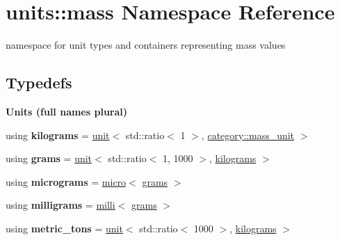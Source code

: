 \hypertarget{namespaceunits_1_1mass}{}\section{units\+:\+:mass Namespace Reference}
\label{namespaceunits_1_1mass}


namespace for unit types and containers representing mass values  


\subsection*{Typedefs}
\begin{Indent}{\bf Units (full names plural)}\par
\begin{DoxyCompactItemize}
\item 
\hypertarget{namespaceunits_1_1mass_aada0f884028ef6dd8fff91f7a450adba}{}using {\bfseries kilograms} = \hyperlink{structunits_1_1unit}{unit}$<$ std\+::ratio$<$ 1 $>$, \hyperlink{namespaceunits_1_1category_a2a957f5535dc0cbe3d3fb3f31e5f0d21}{category\+::mass\+\_\+unit} $>$\label{namespaceunits_1_1mass_aada0f884028ef6dd8fff91f7a450adba}

\item 
\hypertarget{namespaceunits_1_1mass_a9e2e3361968bd7509f6620ee37b5f589}{}using {\bfseries grams} = \hyperlink{structunits_1_1unit}{unit}$<$ std\+::ratio$<$ 1, 1000 $>$, \hyperlink{structunits_1_1unit}{kilograms} $>$\label{namespaceunits_1_1mass_a9e2e3361968bd7509f6620ee37b5f589}

\item 
\hypertarget{namespaceunits_1_1mass_ac013c660b7d96662397d3f3187cf8330}{}using {\bfseries micrograms} = \hyperlink{group___unit_manipulators_gaea53c906ec805110b93f02db4a961971}{micro}$<$ \hyperlink{structunits_1_1unit}{grams} $>$\label{namespaceunits_1_1mass_ac013c660b7d96662397d3f3187cf8330}

\item 
\hypertarget{namespaceunits_1_1mass_a2dfecde3a93525d6342d8c696eacb4cf}{}using {\bfseries milligrams} = \hyperlink{group___unit_manipulators_gaec9d1c320e180eb59f3cb3094d8079dd}{milli}$<$ \hyperlink{structunits_1_1unit}{grams} $>$\label{namespaceunits_1_1mass_a2dfecde3a93525d6342d8c696eacb4cf}

\item 
\hypertarget{namespaceunits_1_1mass_aa65e0a4d45cffff1b00028403cfdf987}{}using {\bfseries metric\+\_\+tons} = \hyperlink{structunits_1_1unit}{unit}$<$ std\+::ratio$<$ 1000 $>$, \hyperlink{structunits_1_1unit}{kilograms} $>$\label{namespaceunits_1_1mass_aa65e0a4d45cffff1b00028403cfdf987}


\end{DoxyCompactItemize}
\end{Indent}
